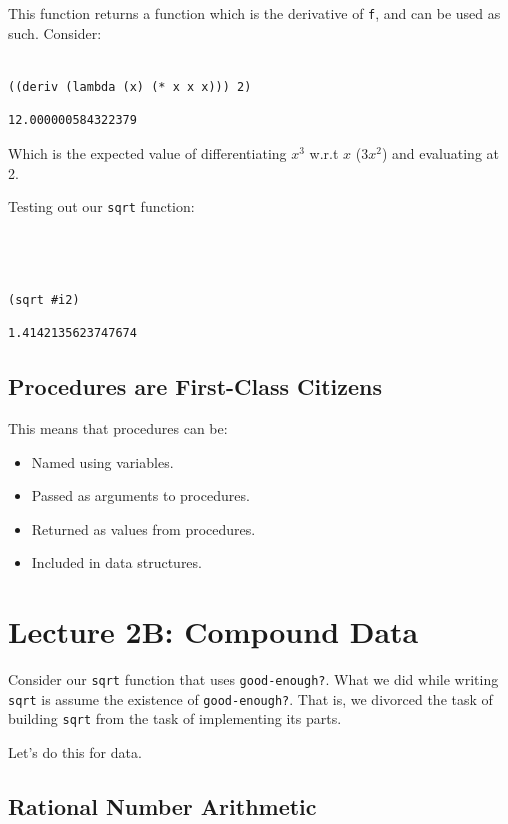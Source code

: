 \documentclass[9pt]{report}
\begin{document}
This function returns a function which is the derivative of \texttt{f},
and can be used as such. Consider:

\begin{verbatim}

((deriv (lambda (x) (* x x x))) 2)
\end{verbatim}

\begin{verbatim}
12.000000584322379
\end{verbatim}


Which is the expected value of differentiating \(x^{3}\) w.r.t \(x\)
(\(3x^2\)) and evaluating at 2.

Testing out our \texttt{sqrt} function:

\begin{verbatim}



(sqrt #i2)
\end{verbatim}

\begin{verbatim}
1.4142135623747674
\end{verbatim}

\section{Procedures are First-Class Citizens}
\label{sec:org864868f}

This means that procedures can be:
\begin{itemize}
\item Named using variables.
\item Passed as arguments to procedures.
\item Returned as values from procedures.
\item Included in data structures.
\end{itemize}

\chapter{Lecture 2B: Compound Data}
\label{sec:orgd8ca9ca}

Consider our \texttt{sqrt} function that uses \texttt{good-enough?}. What we did
while writing \texttt{sqrt} is assume the existence of \texttt{good-enough?}.
That is, we divorced the task of building \texttt{sqrt} from the task of
implementing its parts.

Let's do this for data.

\section{Rational Number Arithmetic}
\label{sec:org6a0db7e}
\end{document}

